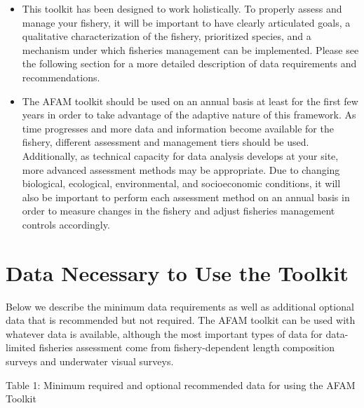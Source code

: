 \documentclass[]{book}
\begin{document}
\begin{itemize}
\item
  This toolkit has been designed to work holistically. To properly
  assess and manage your fishery, it will be important to have clearly
  articulated goals, a qualitative characterization of the fishery,
  prioritized species, and a mechanism under which fisheries management
  can be implemented. Please see the following section for a more
  detailed description of data requirements and recommendations.
\item
  The AFAM toolkit should be used on an annual basis at least for the
  first few years in order to take advantage of the adaptive nature of
  this framework. As time progresses and more data and information
  become available for the fishery, different assessment and management
  tiers should be used. Additionally, as technical capacity for data
  analysis develops at your site, more advanced assessment methods may
  be appropriate. Due to changing biological, ecological, environmental,
  and socioeconomic conditions, it will also be important to perform
  each assessment method on an annual basis in order to measure changes
  in the fishery and adjust fisheries management controls accordingly.
\end{itemize}

\section{Data Necessary to Use the
Toolkit}\label{data-necessary-to-use-the-toolkit}

Below we describe the minimum data requirements as well as additional
optional data that is recommended but not required. The AFAM toolkit can
be used with whatever data is available, although the most important
types of data for data-limited fisheries assessment come from
fishery-dependent length composition surveys and underwater visual
surveys.

Table 1: Minimum required and optional recommended data for using the
AFAM Toolkit
\end{document}
